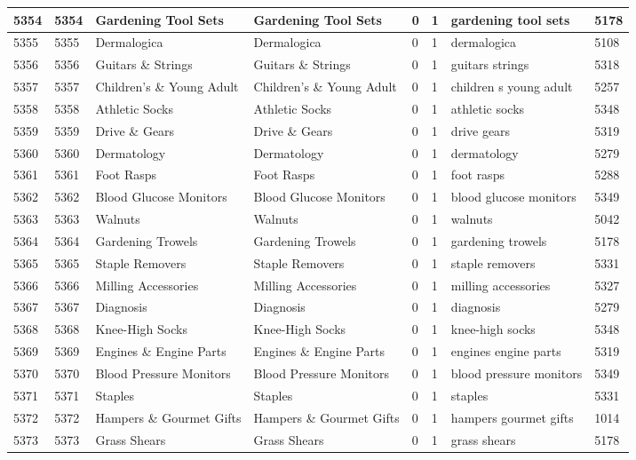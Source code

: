 \begin{longtable}{|l|l|l|l|l|l|l|l|}
5354 & 5354 & Gardening Tool Sets & Gardening Tool Sets & 0 & 1 & gardening tool sets & 5178 \\ \hline 
5355 & 5355 & Dermalogica & Dermalogica & 0 & 1 & dermalogica & 5108 \\ \hline 
5356 & 5356 & Guitars \& Strings & Guitars \& Strings & 0 & 1 & guitars strings & 5318 \\ \hline 
5357 & 5357 & Children's \& Young Adult & Children's \& Young Adult & 0 & 1 & children s young adult & 5257 \\ \hline 
5358 & 5358 & Athletic Socks & Athletic Socks & 0 & 1 & athletic socks & 5348 \\ \hline 
5359 & 5359 & Drive \& Gears & Drive \& Gears & 0 & 1 & drive gears & 5319 \\ \hline 
5360 & 5360 & Dermatology & Dermatology & 0 & 1 & dermatology & 5279 \\ \hline 
5361 & 5361 & Foot Rasps & Foot Rasps & 0 & 1 & foot rasps & 5288 \\ \hline 
5362 & 5362 & Blood Glucose Monitors & Blood Glucose Monitors & 0 & 1 & blood glucose monitors & 5349 \\ \hline 
5363 & 5363 & Walnuts & Walnuts & 0 & 1 & walnuts & 5042 \\ \hline 
5364 & 5364 & Gardening Trowels & Gardening Trowels & 0 & 1 & gardening trowels & 5178 \\ \hline 
5365 & 5365 & Staple Removers & Staple Removers & 0 & 1 & staple removers & 5331 \\ \hline 
5366 & 5366 & Milling Accessories & Milling Accessories & 0 & 1 & milling accessories & 5327 \\ \hline 
5367 & 5367 & Diagnosis & Diagnosis & 0 & 1 & diagnosis & 5279 \\ \hline 
5368 & 5368 & Knee-High Socks & Knee-High Socks & 0 & 1 & knee-high socks & 5348 \\ \hline 
5369 & 5369 & Engines \& Engine Parts & Engines \& Engine Parts & 0 & 1 & engines engine parts & 5319 \\ \hline 
5370 & 5370 & Blood Pressure Monitors & Blood Pressure Monitors & 0 & 1 & blood pressure monitors & 5349 \\ \hline 
5371 & 5371 & Staples & Staples & 0 & 1 & staples & 5331 \\ \hline 
5372 & 5372 & Hampers \& Gourmet Gifts & Hampers \& Gourmet Gifts & 0 & 1 & hampers gourmet gifts & 1014 \\ \hline 
5373 & 5373 & Grass Shears & Grass Shears & 0 & 1 & grass shears & 5178 \\ \hline 

\end{longtable}
